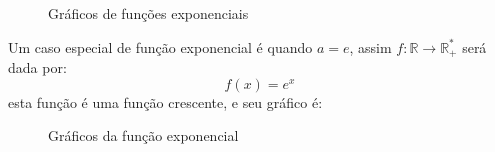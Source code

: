  \begin{figure}[H]
   \caption{Gráficos de funções exponenciais}
  \end{figure}

  Um caso especial de função exponencial é quando $a= e$, assim $f: \mathbb{R} \rightarrow \mathbb{R_{+}^{*}} $ será dada por:
  \[f(x) = e^x\]
  esta função é uma função crescente, e seu gráfico é:

  \begin{figure}[H]
 \centering
    \caption{Gráficos da função exponencial}
  \end{figure}


